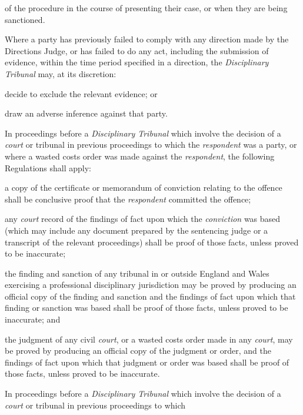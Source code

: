 of the procedure in the course of presenting their case, or when they
are being sanctioned.\\
\par
Where a party has previously failed to comply with any direction made by
the Directions Judge, or has failed to do any act, including the
submission of evidence, within the time period specified in a direction,
the \emph{Disciplinary Tribunal} may, at its discretion:\\\nl \item decide to exclude the relevant evidence; or\item draw an adverse inference against that party.\ln
{}\par
{}
In proceedings before a \emph{Disciplinary Tribunal} which involve the
decision of a \emph{court }or tribunal in previous proceedings to which
the \emph{respondent} was a party, or where a wasted costs order was
made against the \emph{respondent}, the following Regulations shall
apply:\\\nl \item a copy of the certificate or memorandum of conviction relating to the
offence shall be conclusive proof that the \emph{respondent} committed
the offence;\item any \emph{court }record of the findings of fact upon which
the \emph{conviction} was based (which may include any document prepared
by the sentencing judge or a transcript of the relevant proceedings)
shall be proof of those facts, unless proved to be inaccurate;\item the finding and sanction of any tribunal in or outside England and
Wales exercising a professional disciplinary jurisdiction may be proved
by producing an official copy of the finding and sanction and the
findings of fact upon which that finding or sanction was based shall be
proof of those facts, unless proved to be inaccurate; and\item the judgment of any civil \emph{court}, or a wasted costs order made
in any \emph{court}, may be proved by producing an official copy of the
judgment or order, and the findings of fact upon which that judgment or
order was based shall be proof of those facts, unless proved to be
inaccurate.\ln
{}\par
In proceedings before a \emph{Disciplinary Tribunal} which involve the
decision of a \emph{court }or tribunal in previous proceedings to which
